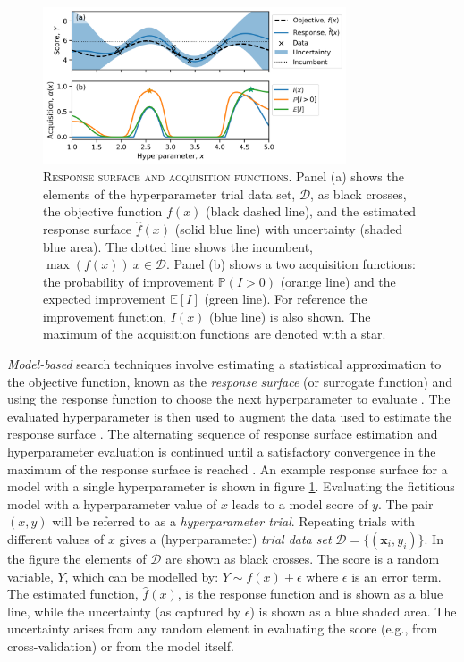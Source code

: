 \begin{figure}
    \centering
    \includegraphics[width=0.8\textwidth]{chapters/msm_optimization/figures/response_surface_explainer.png}
    \caption[Response surface and acquisition functions]{\textsc{Response surface and acquisition functions}. Panel (a) shows the elements of the hyperparameter trial data set, $\mathcal{D}$, as black crosses, the objective function $f(x)$ (black dashed line), and the estimated response surface $\hat{f}(x)$ (solid blue line) with uncertainty (shaded blue area). The dotted line shows the incumbent, $\max{\left(f(x)\right)}\ x\in \mathcal{D}$. Panel (b) shows a two acquisition functions: the probability of improvement $\mathbb{P}(I>0)$ (orange line) and the expected improvement $\mathbb{E}[I]$ (green line). For reference the improvement function, $I(x)$ (blue line) is also shown. The maximum of the acquisition functions are denoted with a star. }
    \label{fig:msm_rsm_explainer}
\end{figure}

\emph{Model-based} search techniques involve estimating a statistical approximation to the objective function, known  as the \emph{response surface} (or surrogate function) and using the response function to choose the next hyperparameter to evaluate \cite{hutterSequentialModelbasedOptimization2011}. The evaluated hyperparameter is then used to augment the data used to estimate the response surface \cite{hutterSequentialModelbasedOptimization2011}. The alternating sequence of response surface estimation and hyperparameter evaluation is continued until a satisfactory convergence in the maximum of the response surface is reached \cite{hutterSequentialModelbasedOptimization2011}. An example response surface for a model with a single hyperparameter is shown in figure \ref{fig:msm_rsm_explainer}. Evaluating the fictitious model with a hyperparameter value of $x$ leads to a model score of $y$. The pair $(x, y)$ will be referred to as a \emph{hyperparameter trial}. Repeating trials with different values of $x$ gives a (hyperparameter) \emph{trial data set}  $\mathcal{D}=\{(\mathbf{x}_{i}, y_{i})\}$. In the figure the elements of $\mathcal{D}$ are shown as black crosses. The score is a random variable, $Y$, which can be modelled by: $Y \sim f(x) + \epsilon$ where $\epsilon$ is an error term. The estimated function, $\hat{f}(x)$, is the response function and is shown as a blue line, while the uncertainty (as captured by $\epsilon$) is shown as a blue shaded area. The uncertainty arises from any random element in evaluating the score (e.g., from cross-validation) or from the model itself.  

